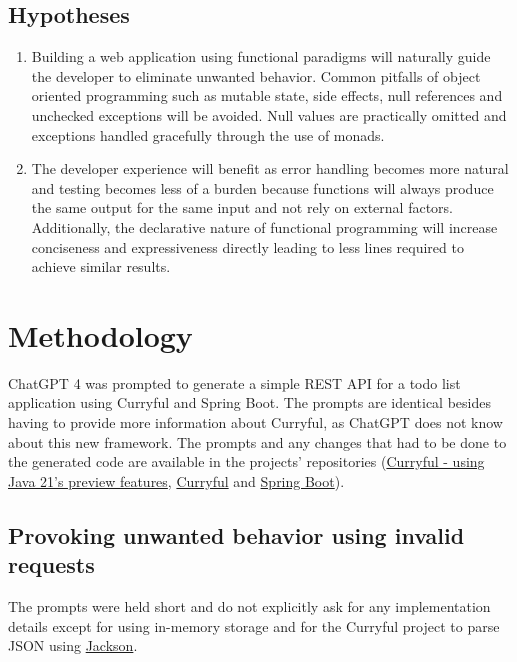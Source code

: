 \documentclass[a4paper]{article}
\begin{document}
\subsection{Hypotheses}

\begin{enumerate}
	\item Building a web application using functional paradigms will naturally guide the developer to
	      eliminate unwanted behavior. Common pitfalls of object oriented programming such as mutable state,
	      side effects, null references and unchecked exceptions will be avoided. Null values are practically omitted
	      and exceptions handled gracefully through the use of monads.
	\item The developer experience will benefit as error handling becomes more natural and testing becomes less
	      of a burden because functions will always produce the same output for the same input and not rely
	      on external factors. Additionally, the declarative nature of functional programming
	      will increase conciseness and expressiveness directly leading to less
	      lines required to achieve similar results.
\end{enumerate}

\section{Methodology}
ChatGPT 4 was prompted to generate a simple REST API for a todo list application
using Curryful and Spring Boot. The prompts are identical besides having to
provide more information about Curryful, as ChatGPT does not know about this new
framework. The prompts and any changes that had to be done to the generated code
are available in the projects' repositories
(\hyperlink{https://github.com/lerchl/curryful-bachelor-thesis-curryful-todo-list-preview-features}{Curryful
	- using Java 21's preview features},
\hyperlink{https://github.com/lerchl/curryful-bachelor-thesis-curryful-todo-list}{Curryful} and
\hyperlink{https://github.com/lerchl/curryful-bachelor-thesis-spring-boot-todo-list}{Spring Boot}).

\subsection{Provoking unwanted behavior using invalid requests}
The prompts were held short and do not explicitly ask for any implementation details except for using in-memory storage
and for the Curryful project to parse JSON using \hyperlink{https://github.com/FasterXML/jackson}{Jackson}.\newline
\end{document}
